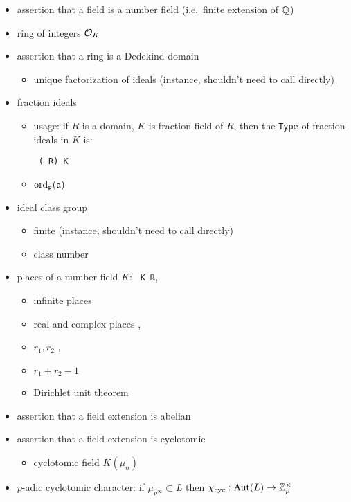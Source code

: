 \begin{itemize}
\item
assertion that a field is a number field (i.e.~finite extension of ${\mathbb {Q}}$)
\item
ring of integers ${\mathcal {O}}_K$ 
\item
assertion that a ring is a Dedekind domain 
\begin{itemize}
\item
unique factorization of ideals 
(instance, shouldn't need to call directly)
\end{itemize}
\item
fraction ideals 
\begin{itemize}
\item
usage: if $R$ is a domain, $K$ is fraction field of $R$,
then the \verb|Type| of fraction ideals in $K$ is:

\verb| (|\verb| R) K|
\item
$\operatorname{ord}_{\mathfrak{p}}({\mathfrak{a}})$ 
\end{itemize}
\item
ideal class group 
\begin{itemize}
\item
finite 
(instance, shouldn't need to call directly)
\item
class number 
\end{itemize}
\item
places of a number field $K$:
\verb| K ℝ|, 
\begin{itemize}
\item
infinite places 
\item
real and complex places
,
\item
$r_1,r_2$
,
\item
$r_1+r_2-1$
\item
Dirichlet unit theorem
\end{itemize}
\item
assertion that a field extension is abelian
\item
assertion that a field extension is cyclotomic
\begin{itemize}
\item
cyclotomic field $K(\mu_n)$
\end{itemize}
\item
$p$-adic cyclotomic character:
if $\mu_{p^\infty}\subset L$
then $\chi_{\mathrm{cyc}}:{\mathrm{Aut}}(L)\to{\mathbb {Z}}_p^\times$
\end{itemize}

